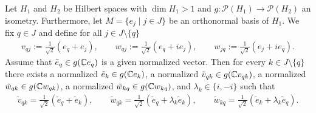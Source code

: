 \begin{lemma} \label{lemma:function_on_onb}
	Let $H_1$ and $H_2$ be Hilbert spaces with $\dim H_1 > 1$ and $g: \mathcal{P}(H_1) \to \mathcal{P}(H_2)$ an isometry. Furthermore, let $M = \{e_j \mid j \in J\}$ be an orthonormal basis of $H_1$. We fix $q \in J$ and define for all $j \in J \setminus \{q\}$
	\begin{align*}
		v_{qj} := \frac{1}{\sqrt{2}} (e_q + e_j), \qquad w_{qj} := \frac{1}{\sqrt{2}}(e_q + ie_j), \qquad w_{jq} := \frac{1}{\sqrt{2}}(e_j + ie_q).
	\end{align*} 
	Assume that $\tilde{e}_q \in g{\left ( \mathbb{C} e_q \right )}$ is a given normalized vector. Then for every $k \in J \setminus \{q\}$ there exists a normalized $\tilde{e}_k \in g(\mathbb{C} e_k)$, a normalized $\tilde{v}_{qk} \in g(\mathbb{C} v_{qk})$, a normalized $\tilde{w}_{qk} \in g(\mathbb{C} w_{qk})$, a normalized $\tilde{w}_{kq} \in g(\mathbb{C} w_{kq})$, and $\lambda_k \in \{i, -i\}$ such that
	\begin{align*}
		\tilde{v}_{qk} = \frac{1}{\sqrt{2}}(\tilde{e}_{q} + \tilde{e}_k), \qquad \tilde{w}_{qk} = \frac{1}{\sqrt{2}}(\tilde{e}_q + \lambda_k \tilde{e}_k), \qquad \tilde{w}_{kq} = \frac{1}{\sqrt{2}} (\tilde{e}_k + \lambda_k \tilde{e}_q).
	\end{align*}
\end{lemma}

